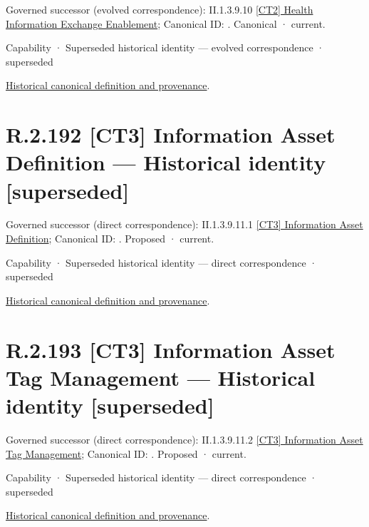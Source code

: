 {\small Governed successor (evolved correspondence): II.1.3.9.10 \hyperref[element:a61a15908ed544e6acf3e9cab63a0267]{[CT2] Health Information Exchange Enablement}; Canonical ID: \texttt{}. Canonical · current.}\par
\label{element:330d1c43856a4322a2e9f331b1a5ed20}
{\small Capability · Superseded historical identity — evolved correspondence · superseded}\par
\href{../../../../../../../continuum/strategy/capability/330d1c43856a4322a2e9f331b1a5ed20.md}{Historical canonical definition and provenance}.\par
\section*{R.2.192 [CT3] Information Asset Definition — Historical identity [superseded]}
\label{navigation:R.2.192}

{\small Governed successor (direct correspondence): II.1.3.9.11.1 \hyperref[element:05c58b2ccfcc45e9a6c70d9a569c4f61]{[CT3] Information Asset Definition}; Canonical ID: \texttt{}. Proposed · current.}\par
\label{element:166a22463d2c4534bda7ae31273398b6}
{\small Capability · Superseded historical identity — direct correspondence · superseded}\par
\href{../../../../../../../continuum/strategy/capability/166a22463d2c4534bda7ae31273398b6.md}{Historical canonical definition and provenance}.\par
\section*{R.2.193 [CT3] Information Asset Tag Management — Historical identity [superseded]}
\label{navigation:R.2.193}

{\small Governed successor (direct correspondence): II.1.3.9.11.2 \hyperref[element:df27c3ba6e164e56af7bff4e1eb1954a]{[CT3] Information Asset Tag Management}; Canonical ID: \texttt{}. Proposed · current.}\par
\label{element:ae44a4ee78414d1098814315793bd751}
{\small Capability · Superseded historical identity — direct correspondence · superseded}\par
\href{../../../../../../../continuum/strategy/capability/ae44a4ee78414d1098814315793bd751.md}{Historical canonical definition and provenance}.\par

